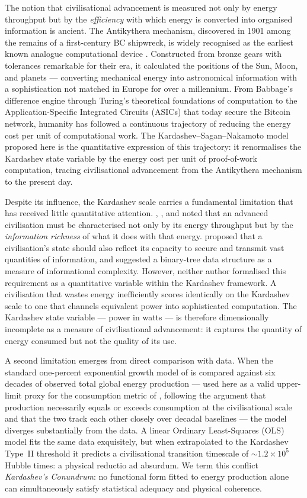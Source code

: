 \documentclass[final,5p,times,twocolumn,authoryear]{elsarticle}
\begin{document}
The notion that civilisational advancement is measured not only by
energy throughput but by the \emph{efficiency} with which energy is
converted into organised information is ancient. The Antikythera
mechanism, discovered in 1901 among the remains of a first-century
BC shipwreck, is widely recognised as the earliest known analogue
computational device \citep{Freeth2021}. Constructed from bronze
gears with tolerances remarkable for their era, it calculated the
positions of the Sun, Moon, and planets --- converting mechanical
energy into astronomical information with a sophistication not
matched in Europe for over a millennium. From Babbage's difference
engine through Turing's theoretical foundations of computation
\citep{swa2017} to the Application-Specific Integrated Circuits
(ASICs) that today secure the Bitcoin network, humanity has
followed a continuous trajectory of reducing the energy cost per
unit of computational work. The Kardashev--Sagan--Nakamoto model
proposed here is the quantitative expression of this trajectory:
it renormalises the Kardashev state variable by the energy cost
per unit of proof-of-work computation, tracing civilisational
advancement from the Antikythera mechanism to the present day.


Despite its influence, the Kardashev scale carries a fundamental
limitation that has received little quantitative attention.
\citet{kar64}, \citet{sagan73}, and \citet{Shklovskii1966} noted
that an advanced civilisation must be characterised not only by 
its energy throughput but by the \emph{information richness} of 
what it does with that energy.
\citet{sagan73} proposed that a civilisation's state should also
reflect its capacity to secure and transmit vast quantities of
information, and suggested a binary-tree data structure as a measure
of informational complexity. However, neither author formalised this
requirement as a quantitative variable within the Kardashev framework.
A civilisation that wastes energy inefficiently scores identically on
the Kardashev scale to one that channels equivalent power into
sophisticated computation. The Kardashev state variable --- power in
watts --- is therefore dimensionally incomplete as a measure of
civilisational advancement: it captures the quantity of energy
consumed but not the quality of its use.

A second limitation emerges from direct comparison with data.
When the standard one-percent exponential growth model of
\citet{kar64} is compared against six decades of observed total
global energy production \citep{Ritchie2022} --- used here as a
valid upper-limit proxy for the consumption metric of \citet{kar64},
following the argument that production necessarily equals or exceeds
consumption at the civilisational scale and that the two track each
other closely over decadal baselines --- the model diverges
substantially from the data. A linear Ordinary Least-Squares (OLS)
model fits the same data exquisitely, but when extrapolated to the
Kardashev Type~II threshold it predicts a civilisational transition
timescale of $\sim 1.2 \times 10^{5}$ Hubble times: a physical
reductio ad absurdum. We term this conflict \textit{Kardashev's
Conundrum}: no functional form fitted to energy production alone
can simultaneously satisfy statistical adequacy and physical
coherence.
\end{document}

